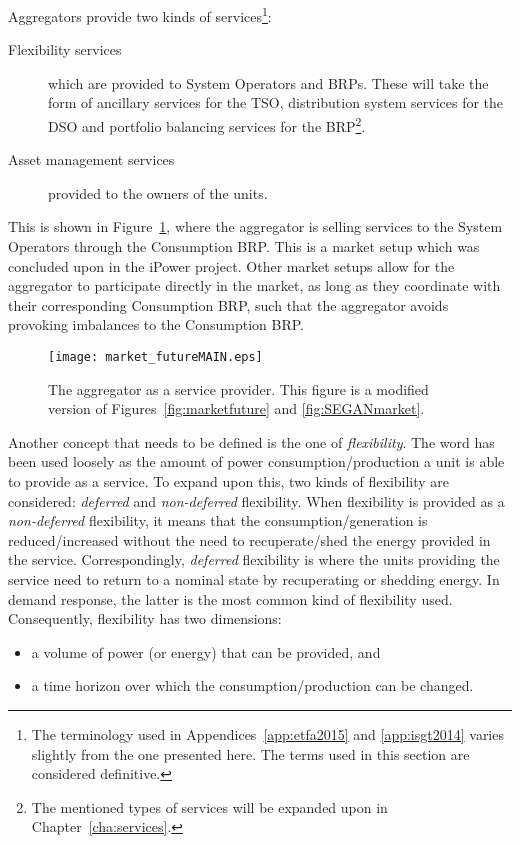 Aggregators provide two kinds of services\footnote{The terminology used in Appendices~\ref{app:etfa2015} and \ref{app:isgt2014} varies slightly from the one presented here. The terms used in this section are considered definitive.}:
\begin{description}
	\item[Flexibility services] which are provided to System Operators and BRPs. These will take the form of ancillary services for the TSO, distribution system services for the DSO and portfolio balancing services for the BRP\footnote{The mentioned types of services will be expanded upon in Chapter~\ref{cha:services}.}.
	\item[Asset management services] provided to the owners of the units.
\end{description}
This is shown in Figure~\ref{fig:market_futureMAIN}, where the aggregator is selling services to the System Operators through the Consumption BRP. This is a market setup which was concluded upon in the iPower project. Other market setups allow for the aggregator to participate directly in the market, as long as they coordinate with their corresponding Consumption BRP, such that the aggregator avoids provoking imbalances to the Consumption BRP.
\begin{figure}[htbp!]
\centering
\texttt{[image: market\_futureMAIN.eps]}
\caption{The aggregator as a service provider. This figure is a modified version of Figures~\ref{fig:marketfuture} and \ref{fig:SEGANmarket}.}
\label{fig:market_futureMAIN}
\end{figure}

Another concept that needs to be defined is the one of \emph{flexibility}. The word has been used loosely as the amount of power consumption/production a unit is able to provide as a service. To expand upon this, two kinds of flexibility are considered: \emph{deferred} and \emph{non-deferred} flexibility. When flexibility is provided as a \emph{non-deferred} flexibility,  it means that the consumption/generation is reduced/increased without the need to recuperate/shed the energy provided in the service. Correspondingly, \emph{deferred} flexibility is where the units providing the service need to return to a nominal state by recuperating or shedding energy. In demand response, the latter is the most common kind of flexibility used. Consequently, flexibility has two dimensions:
\begin{itemize}
	\item a volume of power (or energy) that can be provided, and
	\item a time horizon over which the consumption/production can be changed.
\end{itemize} 

